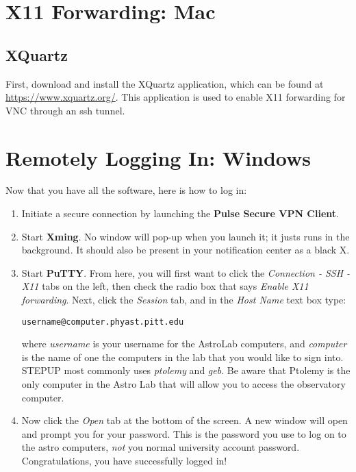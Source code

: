 \documentclass[11pt]{article}
\begin{document}
\section{X11 Forwarding: Mac}
\subsection{XQuartz}
First, download and install the XQuartz application, which can be found at \url{https://www.xquartz.org/}. This application is used to enable X11 forwarding for VNC through an ssh tunnel.


\section{Remotely Logging In: Windows}
Now that you have all the software, here is how to log in:
\begin{enumerate}
\item Initiate a secure connection by launching the \textbf{Pulse Secure VPN Client}.

\item Start \textbf{Xming}. No window will pop-up when you launch it; it justs runs in the background. It should also be present in your notification center as a black X.
\item Start \textbf{PuTTY}. From here, you will first want to click the \emph{Connection - SSH - X11} tabs on the left, then check the radio box that says \emph{Enable X11 forwarding}. Next, click the \emph{Session} tab, and in the \emph{Host Name} text box type:

\begin{verbatim}
username@computer.phyast.pitt.edu
\end{verbatim}

where \emph{username} is your username for the AstroLab computers, and \emph{computer} is the name of one the computers in the lab that you would like to sign into. STEPUP most commonly uses \emph{ptolemy} and \emph{geb}. Be aware that Ptolemy is the only computer in the Astro Lab that will allow you to access the observatory computer. 
\item Now click the \emph{Open} tab at the bottom of the screen. A new window will open and prompt you for your password. This is the password you use to log on to the astro computers, \emph{not} you normal university account password. Congratulations, you have successfully logged in!
\end{enumerate}
\end{document}
